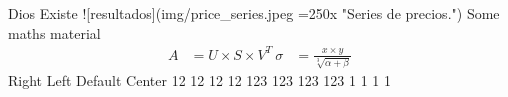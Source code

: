 \markdownRendererInterblockSeparator
{}Dios Existe\markdownRendererInterblockSeparator
{}![resultados](img/price_series.jpeg =250x "Series de precios.")\markdownRendererInterblockSeparator
{}\markdownRendererHorizontalRule{}\markdownRendererInterblockSeparator
{}\markdownRendererInterblockSeparator
{}\markdownRendererUlBegin
\markdownRendererUlItem Some maths material\markdownRendererUlItemEnd 
\markdownRendererUlEnd \markdownRendererInterblockSeparator
{}\begin{align} A &= U \times S \times V^T\ \sigma &= \frac{x\times y}{\sqrt[3]{\alpha + \beta}} \end{align}\markdownRendererInterblockSeparator
{}\markdownRendererHorizontalRule{}\markdownRendererInterblockSeparator
{}\markdownRendererInterblockSeparator
{}%
{{Right}%
{Left}%
{Default}%
{Center}%
}%
{{12}%
{12}%
{12}%
{12}%
}%
{{123}%
{123}%
{123}%
{123}%
}%
{{1}%
{1}%
{1}%
{1}%
}%
\markdownRendererInterblockSeparator
{}\markdownRendererHorizontalRule{}\relax